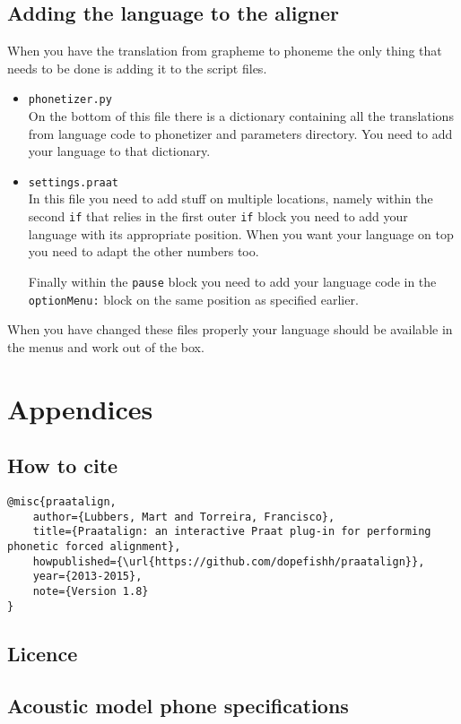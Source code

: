 \section{Adding the language to the aligner}
When you have the translation from grapheme to phoneme the only thing that
needs to be done is adding it to the script files.
\begin{itemize}
	\item \texttt{phonetizer.py}\\
		On the bottom of this file there is a dictionary containing all the
		translations from language code to phonetizer and parameters directory. You
		need to add your language to that dictionary.
	\item \texttt{settings.praat}\\
		In this file you need to add stuff on multiple locations, namely within the
		second \texttt{if} that relies in the first outer \texttt{if} block you
		need to add your language with its appropriate position. When you want your
		language on top you need to adapt the other numbers too.

		Finally within the \texttt{pause} block you need to add your language code
		in the \texttt{optionMenu:} block on the same position as specified
		earlier.
\end{itemize}
When you have changed these files properly your language should be available in
the menus and work out of the box.

\chapter{Appendices}
\section{How to cite}
\begin{lstlisting}[caption={Bibtex snippet}]
@misc{praatalign,
	author={Lubbers, Mart and Torreira, Francisco},
	title={Praatalign: an interactive Praat plug-in for performing phonetic forced alignment},
	howpublished={\url{https://github.com/dopefishh/praatalign}},
	year={2013-2015},
	note={Version 1.8}
}
\end{lstlisting}

\section{Licence}


\section{Acoustic model phone specifications}\label{sec:models}
